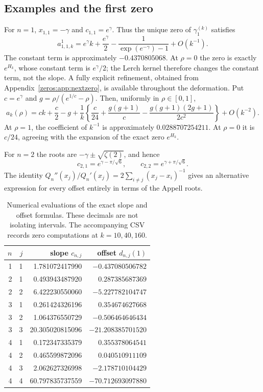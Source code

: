 \subsection{Examples and the first zero}
For $n=1$, $x_{1,1}=-\gamma$ and $c_{1,1}=e^\gamma$. Thus the unique zero of $\gamma_1^{(k)}$ satisfies
\begin{equation}\label{zeros:eq:n1asympt}
 a_{1,1,k}^{1}
   =e^\gamma k+\frac{e^\gamma}{2}
      -\frac1{\exp(e^{-\gamma})-1}+O(k^{-1}).
\end{equation}
The constant term is approximately $-0.4370805068$. At $\rho=0$ the zero is exactly $e^{H_k}$, whose constant term is $e^\gamma/2$; the Lerch kernel therefore changes the constant term, not the slope.
A fully explicit refinement, obtained from Appendix~\ref{zeros:app:nextzero}, is available throughout the deformation. Put $c=e^\gamma$ and $g=\rho/(e^{1/c}-\rho)$. Then, uniformly in $\rho\in[0,1]$,
\begin{equation}\label{zeros:eq:n1third}
 a_k(\rho)=ck+\frac c2-g
   +\frac1k\left\{\frac c{24}+\frac{g(g+1)}c
          -\frac{g(g+1)(2g+1)}{2c^2}\right\}+O(k^{-2}).
\end{equation}
At $\rho=1$, the coefficient of $k^{-1}$ is approximately $0.0288707254211$. At $\rho=0$ it is $c/24$, agreeing with the expansion of the exact zero $e^{H_k}$.


For $n=2$ the roots are $-\gamma\pm\sqrt{\zeta(2)}$, and hence
\begin{equation}\label{zeros:eq:n2slopes}
 c_{2,1}=e^{\gamma-\pi/\sqrt6},\qquad
 c_{2,2}=e^{\gamma+\pi/\sqrt6}.
\end{equation}
The identity $Q_n''(x_j)/Q_n'(x_j)=2\sum_{i\neq j}(x_j-x_i)^{-1}$ gives an alternative expression for every offset entirely in terms of the Appell roots.

\begin{table}[htbp]
\centering\small
\begin{tabular}{rrrr}
\toprule
$n$ & $j$ & slope $c_{n,j}$ & offset $d_{n,j}(1)$\\
\midrule
1&1&1.781072417990&$-0.437080506782$\\
2&1&0.493943487920&$\phantom{-}0.287385687369$\\
2&2&6.422230550060&$-5.227782104747$\\
3&1&0.261424326196&$\phantom{-}0.354674627668$\\
3&2&1.064376550729&$-0.506464646434$\\
3&3&20.305020815096&$-21.208385701520$\\
4&1&0.172347335379&$\phantom{-}0.355378064541$\\
4&2&0.465599872096&$\phantom{-}0.040510911109$\\
4&3&2.062627326998&$-2.178710104429$\\
4&4&60.797835737559&$-70.712693097880$\\
\bottomrule
\end{tabular}
\caption{Numerical evaluations of the exact slope and offset formulas. These decimals are not isolating intervals. The accompanying CSV records zero computations at $k=10,40,160$.}
\label{zeros:tab:slopes}
\end{table}

